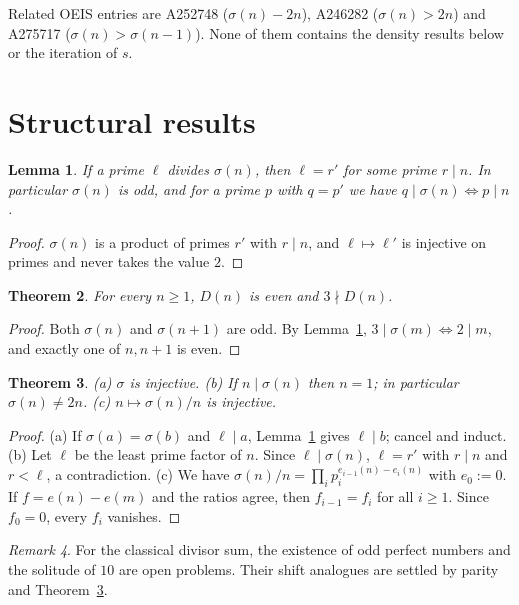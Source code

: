 \documentclass[11pt]{amsart}
\newtheorem{theorem}{Theorem}[section]
\newtheorem{lemma}[theorem]{Lemma}
\theoremstyle{remark}
\newtheorem{remark}[theorem]{Remark}
\newcommand{\s}{\sigma}
\newcommand{\nx}[1]{#1'}
\begin{document}
Related OEIS entries are A252748 ($\s(n)-2n$), A246282 ($\s(n)>2n$) and A275717 ($\s(n)>\s(n-1)$). None of them contains the density results below or the iteration of $s$.

\section{Structural results}

\begin{lemma}\label{lem:div}
If a prime $\ell$ divides $\s(n)$, then $\ell=\nx r$ for some prime $r\mid n$. In particular $\s(n)$ is odd, and for a prime $p$ with $q=\nx p$ we have $q\mid\s(n)\iff p\mid n$.
\end{lemma}
\begin{proof}
$\s(n)$ is a product of primes $\nx r$ with $r\mid n$, and $\ell\mapsto\nx\ell$ is injective on primes and never takes the value $2$.
\end{proof}

\begin{theorem}\label{thm:W1}
For every $n\ge1$, $D(n)$ is even and $3\nmid D(n)$.
\end{theorem}
\begin{proof}
Both $\s(n)$ and $\s(n+1)$ are odd. By Lemma~\ref{lem:div}, $3\mid\s(m)\iff 2\mid m$, and exactly one of $n,n+1$ is even.
\end{proof}

\begin{theorem}\label{thm:inj}
(a) $\s$ is injective. (b) If $n\mid\s(n)$ then $n=1$; in particular $\s(n)\ne 2n$. (c) $n\mapsto\s(n)/n$ is injective.
\end{theorem}
\begin{proof}
(a) If $\s(a)=\s(b)$ and $\ell\mid a$, Lemma~\ref{lem:div} gives $\ell\mid b$; cancel and induct. (b) Let $\ell$ be the least prime factor of $n$. Since $\ell\mid\s(n)$, $\ell=\nx r$ with $r\mid n$ and $r<\ell$, a contradiction. (c) We have $\s(n)/n=\prod_i p_i^{e_{i-1}(n)-e_i(n)}$ with $e_0:=0$. If $f=e(n)-e(m)$ and the ratios agree, then $f_{i-1}=f_i$ for all $i\ge1$. Since $f_0=0$, every $f_i$ vanishes.
\end{proof}

\begin{remark}
For the classical divisor sum, the existence of odd perfect numbers and the solitude of $10$ are open problems. Their shift analogues are settled by parity and Theorem~\ref{thm:inj}.
\end{remark}
\end{document}
